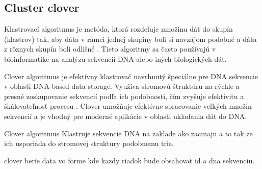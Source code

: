 \subsection{Cluster clover}

Klastrovací algoritmus je metóda, ktorá rozdeľuje množinu dát do skupín (klastrov) tak, aby dáta v rámci jednej skupiny boli si navzájom podobné a dáta z rôznych skupín boli odlišné \cite{Qu2022Clover}. Tieto algoritmy sa často používajú v bioinformatike na analýzu sekvencií DNA alebo iných biologických dát.

Clover algoritmus je efektívny klastrovač navrhnutý špeciálne pre DNA sekvencie v oblasti DNA-based data storage. Využíva stromovú štruktúru na rýchle a presné zoskupovanie sekvencií podľa ich podobnosti, čím zvyšuje efektivitu a škálovateľnosť procesu \cite{Qu2022Clover}. Clover umožňuje efektívne spracovanie veľkých množín sekvencií a je vhodný pre moderné aplikácie v oblasti ukladania dát do DNA.

Clover algoritmus Klastruje sekvencie DNA na zaklade ako zacinaju a to tak ze ich usporiada do stromovej struktury podobnemu trie.

clover berie data vo forme kde kazdy riadok bude obsahovat id a dna sekvenciu.
 